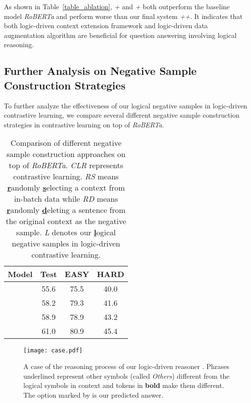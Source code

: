 \documentclass[11pt,a4paper]{article}
\begin{document}
As shown in Table~\ref{table_ablation}, \emph{+} and \emph{+} both outperform the baseline model \emph{RoBERTa} and perform worse than our final system \emph{++}. It indicates that both logic-driven context extension framework and logic-driven data augmentation algorithm are beneficial for question answering involving logical reasoning.

\subsection{Further Analysis on Negative Sample Construction Strategies}
To further analyze the effectiveness of our logical negative samples in logic-driven contrastive learning, we compare several different negative sample construction strategies in contrastive learning on top of \emph{RoBERTa}.
\begin{table}[!th]
    \setlength\tabcolsep{4pt}
    \newcommand{\tabincell}[2]{\begin{tabular}{@{}#1@{}}#2\end{tabular}}
	\centering
	\begin{tabular}{l|ccc}
	\toprule
    \bf Model & \bf Test & \bf EASY & \bf HARD \\
	\midrule
     & 55.6 & 75.5 & 40.0 \\
     & 58.2 & 79.3 & 41.6 \\
     & 58.9 & 78.9 & 43.2 \\
     & 61.0 & 80.9 & 45.4 \\
	\bottomrule
 	\end{tabular}
	\caption{Comparison of different negative sample construction approaches on top of \emph{RoBERTa}.
	\emph{CLR} represents contrastive learning. \emph{RS} means \underline{\bf r}andomly \underline{\bf s}electing a context from in-batch data while \emph{RD} means \underline{\bf r}andomly \underline{\bf d}eleting a sentence from the original context as the negative sample. \emph{L} denotes our \underline{\bf l}ogical negative samples in logic-driven contrastive learning.}
	\label{table_logical_negative}
\end{table}

\begin{figure*}[!th]
\centering
\texttt{[image: case.pdf]}
\caption{\label{figure_case} A case of the reasoning process of our logic-driven reasoner \emph{}. Phrases underlined represent other symbols (called \emph{Others}) different from the logical symbols in context and tokens in \textbf{bold} make them different. The option marked by \textcolor[RGB]{74,163,87}{\checkmark} is our predicted answer.}
\end{figure*}
\end{document}
